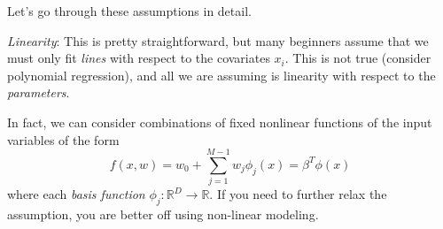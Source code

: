 Let's go through these assumptions in detail.  

\textit{Linearity}: This is pretty straightforward, but many beginners assume that we must only fit \textit{lines} with respect to the covariates $x_i$. This is not true (consider polynomial regression), and all we are assuming is linearity with respect to the \textit{parameters}. 

In fact, we can consider combinations of fixed nonlinear functions of the input variables of the form
\begin{equation}
  f(x, w) = w_0 + \sum_{j=1}^{M-1} w_j \phi_j (x) = \beta^T \phi(x)
\end{equation}
where each \textit{basis function} $\phi_j: \mathbb{R}^D \longrightarrow \mathbb{R}$. If you need to further relax the assumption, you are better off using non-linear modeling. 

